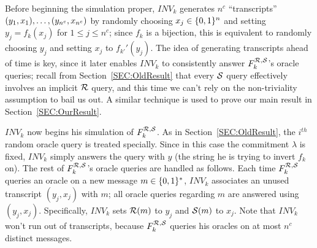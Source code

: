 Before beginning the simulation proper, $INV_k$ generates $n^c$
``transcripts'' $(y_1,x_1), \ldots, \\(y_{n^c},x_{n^c})$ by randomly choosing $x_j
\in \{0,1\}^{n}$ and setting $y_j = f_k(x_j)$ for $1 \leq j \leq n^c$; since
$f_k$ is a bijection, this is equivalent to randomly choosing $y_j$ and
setting $x_j$ to 
$f_{k'}'(y_j)$.  The idea of generating transcripts ahead of time is key,
since it later enables $INV_k$ to consistently answer $F^{\mathcal{R},\mathcal{S}}_{k}$'s
oracle queries; recall from Section~\ref{SEC:OldResult} that every $\mathcal{S}$
query effectively involves an implicit $\mathcal{R}$ query, and this time we can't
rely on the non-triviality assumption to bail us out. A similar technique is
used to prove our main result in Section~\ref{SEC:OurResult}.  

$INV_k$ now begins his simulation of $F^{\mathcal{R},\mathcal{S}}_{k}$. As in
Section~\ref{SEC:OldResult}, the $i^{th}$ random oracle query is treated
specially.  Since in this case the commitment $\lambda$ is fixed, $INV_k$
simply answers the query with $y$ (the string he is trying to invert $f_k$
on). The rest of $F^{\mathcal{R},\mathcal{S}}_{k}$'s oracle queries are handled as
follows. Each time $F^{\mathcal{R},\mathcal{S}}_{k}$ queries an oracle on a new message 
$m \in \{0,1\}^{*}$, $INV_k$ associates an unused transcript $(y_j,x_j)$ with
$m$; all oracle queries regarding $m$ are answered using $(y_j,x_j)$.
Specifically, $INV_k$ sets $\mathcal{R}(m)$ to $y_j$ and  $\mathcal{S}(m)$ to $x_j$.
Note that $INV_k$ won't run out of
transcripts, because $F^{\mathcal{R},\mathcal{S}}_{k}$ queries his oracles on at most $n^c$
distinct messages. 

